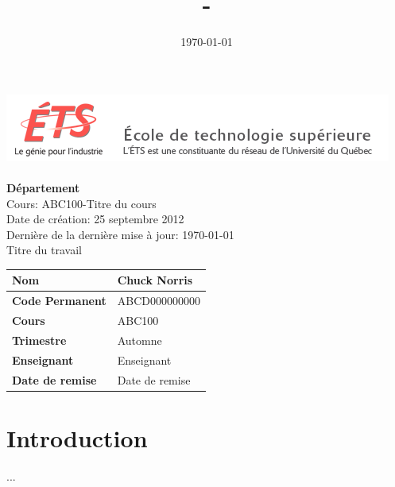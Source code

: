 \documentclass[12pt]{article}
\author{\nom}
\date{\today}
\title{\ciglecours - \titredocument}
\newcommand{\nom}{Chuck Norris}
\newcommand{\codepermanent}{ABCD000000000}
\newcommand{\trimestre}{Automne \the\year}
\newcommand{\departement}{Département}
\newcommand{\ciglecours}{ABC100}
\newcommand{\titrecours}{Titre du cours}
\newcommand{\enseignant}{Enseignant}
\newcommand{\titredocument}{Titre du travail}
\newcommand{\dateremise}{Date de remise}
\begin{document}
\noindent
\includegraphics[scale=0.80]{logo_ets.png} \\ \\
{\bf \departement} \\
Cours: \ciglecours\;-\;\titrecours \\
Date de création: 25 septembre 2012 \\
Dernière de la dernière mise à jour: \today \\

\noindent
{\Large \titredocument} \\

\noindent
\def\arraystretch{1.5}%
\begin{tabularx}{\textwidth}{|X|X|}
	\hline
	\textbf{Nom} & \nom \\ \hline
	\textbf{Code Permanent} & \codepermanent \\ \hline
	\textbf{Cours} & \ciglecours \\ \hline
	\textbf{Trimestre} & \trimestre \\ \hline
	\textbf{Enseignant} & \enseignant \\ \hline
	\textbf{Date de remise} & \dateremise \\ \hline
\end{tabularx}

\newpage

\tableofcontents \clearpage

\section{Introduction}
...
\end{document}
